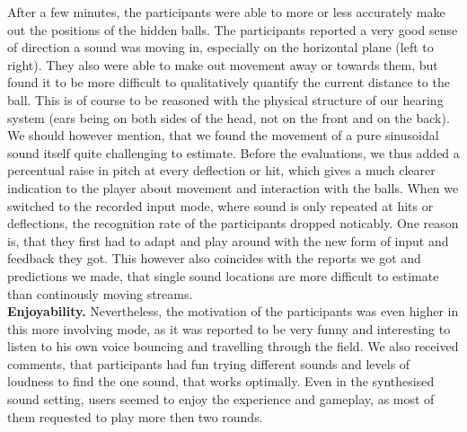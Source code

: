 \documentclass[conference]{IEEEtran}
\begin{document}
After a few minutes, the participants were able to more or less accurately make out the positions of the hidden balls.
The participants reported a very good sense of direction a sound was moving in, especially on the horizontal plane (left to right).
They also were able to make out movement away or towards them, but found it to be more difficult to qualitatively quantify the current distance to the ball.
This is of course to be reasoned with the physical structure of our hearing system (ears being on both sides of the head, not on the front and on the back).
We should however mention, that we found the movement of a pure sinusoidal sound itself quite challenging to estimate.
Before the evaluations, we thus added a percentual raise in pitch at every deflection or hit, which gives a much clearer indication to the player about movement and interaction with the balls.
When we switched to the recorded input mode, where sound is only repeated at hits or deflections, the recognition rate of the participants dropped noticably.
One reason is, that they first had to adapt and play around with the new form of input and feedback they got.
This however also coincides with the reports we got and predictions we made, that single sound locations are more difficult to estimate than continously moving streams. \\
\textbf{Enjoyability.}
Nevertheless, the motivation of the participants was even higher in this more involving mode, as it was reported to be very funny and interesting to listen to his own voice bouncing and travelling through the field.
We also received comments, that participants had fun trying different sounds and levels of loudness to find the one sound, that works optimally.
Even in the synthesised sound setting, users seemed to enjoy the experience and gameplay, as most of them requested to play more then two rounds.
% 
% 
\end{document}
